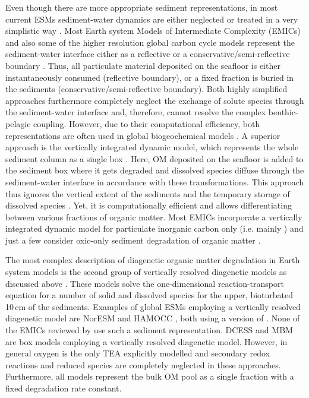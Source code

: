 \documentclass[gmd, manuscript]{copernicus}
\begin{document}
Even though there are more appropriate sediment representations, in most current ESMs sediment-water dynamics are either neglected or treated in a very simplistic way \citep{soetaert_coupling_2000, huelse_biopump_models_2017}. 
Most Earth system Models of Intermediate Complexity (EMICs) and also some of the higher resolution global carbon cycle models represent the sediment-water interface either as a 
reflective or a conservative/semi-reflective boundary \citep{huelse_biopump_models_2017}. 
Thus, all particulate material deposited on the seafloor is either instantaneously consumed (reflective boundary), or a fixed fraction is buried in the sediments (conservative/semi-reflective boundary). 
Both highly simplified approaches furthermore completely neglect the exchange of solute species through the sediment-water interface and, therefore, cannot resolve the complex benthic-pelagic coupling. 
However, due to their computational efficiency, both representations are often used in global biogeochemical models \citep[e.g.][]{najjar_impact_2007, ridgwell_marine_2007, goosse_description_2010}. 
A superior approach is the vertically integrated dynamic model, which represents the whole sediment column as a single box \citep{huelse_biopump_models_2017}. Here, OM deposited on 
the seafloor is added to the sediment box where it gets degraded and dissolved species diffuse through the sediment-water interface in accordance with these transformations. 
This approach thus ignores the vertical extent of the sediments and the temporary storage of dissolved species \citep{soetaert_coupling_2000}. Yet, it is computationally efficient and 
allows differentiating between various fractions of organic matter. Most EMICs incorporate a vertically integrated dynamic model for particulate inorganic carbon only 
(i.e. mainly ) and just a few  consider oxic-only sediment degradation of organic matter \citep{huelse_biopump_models_2017}. 

The most complex description of diagenetic organic matter degradation in Earth system models is the second group of vertically resolved diagenetic models as discussed above 
\citep[e.g.][]{heinze_global_1999, munhoven_glacialinterglacial_2007, shaffer_presentation_2008}. 
These models solve the one-dimensional reaction-transport equation for a number of solid and dissolved species for the upper, bioturbated 10\,cm of the sediments. 
Examples of global ESMs employing a vertically resolved diagenetic model are NorESM \citep{tjiputra_evaluation_2013} and HAMOCC \citep{palastanga_long_term_2011, ilyina_global_2013}, 
both using a version of \citet{heinze_global_1999}. None of the EMICs reviewed by \citet{huelse_biopump_models_2017} use such a sediment representation. 
DCESS \citep{shaffer_presentation_2008} and MBM \citep{munhoven_glacialinterglacial_2007} are box models employing a vertically resolved diagenetic model. 
However, in general oxygen is the only TEA explicitly modelled and secondary redox reactions and reduced species are completely neglected in these approaches. 
Furthermore, all models represent the bulk OM pool as a single fraction with a fixed degradation rate constant. 
\end{document}
